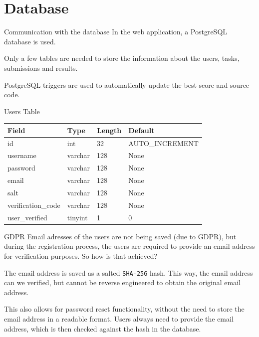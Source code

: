 \documentclass{beamer}
\begin{document}
	\begin{frame}[fragile]
		\tiny
		\inputminted{python}{examples/4/app.py}
	\end{frame}

	\section{Database}

	\begin{frame}{Communication with the database}
		In the web application, a PostgreSQL database is used. \par

		Only a few tables are needed to store the information about the users, tasks, submissions and results. \par

		PostgreSQL triggers are used to automatically update the best score and source code. 
	\end{frame}

	\begin{frame}{Users Table}
		\centering
		\begin{tabular}{|l|l|l|l|}
		\hline
		Field & Type & Length & Default \\
		\hline
		id & int & 32 & AUTO\_INCREMENT \\
		username & varchar & 128 & None \\
		password & varchar & 128 & None \\
		email & varchar & 128 & None \\
		salt & varchar & 128 & None \\
		verification\_code & varchar & 128 & None \\
		user\_verified & tinyint & 1 & 0 \\
		\hline
		\end{tabular}
	\end{frame}

	\begin{frame}{GDPR}
		Email adresses of the users are not being saved (due to GDPR), but during the registration process, the users are required to provide an email address for verification purposes. So how is that achieved?\par

		The email address is saved as a salted \texttt{SHA-256} hash. This way, the email address can we verified, but cannot be reverse engineered to obtain the original email address. \par

		This also allows for password reset functionality, without the need to store the email address in a readable format. Users always need to provide the email address, which is then checked against the hash in the database.
	\end{frame}
\end{document}

